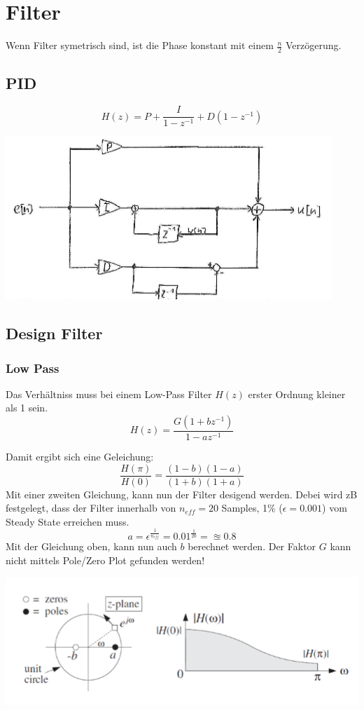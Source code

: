 \section{Filter}
Wenn Filter symetrisch sind, ist die Phase konstant mit einem $\frac{n}{2}$ Verzögerung. 

\subsection{PID}
\[
H(z) = P + \frac{I}{1 - z^{-1}} + D(1-z^{-1})
\]
\begin{center}
	\includegraphics[width=0.7\columnwidth]{Images/pid}
\end{center}

\subsection{Design Filter}
\subsubsection{Low Pass}
Das Verhältniss muss bei einem Low-Pass Filter $H(z)$ erster Ordnung kleiner als 1 sein.
\[
H(z) = \frac{G(1 + bz^{-1})}{1 - az^{-1}}
\]

Damit ergibt sich eine Geleichung:
\[
\frac{H(\pi)}{H(0)} = \frac{(1 - b)(1 - a)}{(1+ b)(1 +a)}
\]
Mit einer zweiten Gleichung, kann nun der Filter desigend werden. Debei wird zB festgelegt, dass der Filter innerhalb von $n_{eff} = 20$ Samples, 1\% ($\epsilon=0.001$) vom Steady State erreichen muss.
\[
a = \epsilon^{\frac{1}{n_{eff}}} = 0.01^{\frac{1}{20}} = \approxeq 0.8
\]
Mit der Gleichung oben, kann nun auch $b$ berechnet werden. Der Faktor $G$ kann nicht mittels Pole/Zero Plot gefunden werden!

\begin{center}
	\includegraphics[width=0.8\columnwidth]{Images/lp}
\end{center}

